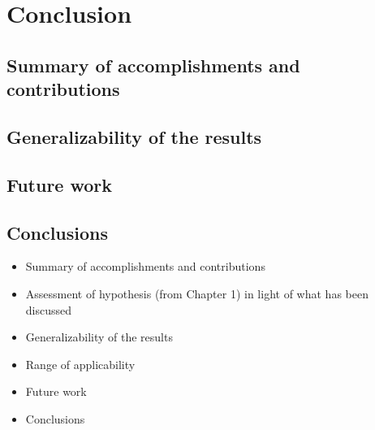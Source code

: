 \chapter{Conclusion} \label{chapter:conclusion}

\section{Summary of accomplishments and contributions}
\section{Generalizability of the results}
\section{Future work}
\section{Conclusions}

\begin{itemize}
    \item Summary of accomplishments and contributions
    \item Assessment of hypothesis (from Chapter 1) in light of what has been discussed
    \item Generalizability of the results
    \item Range of applicability
    \item Future work
    \item Conclusions
\end{itemize}

